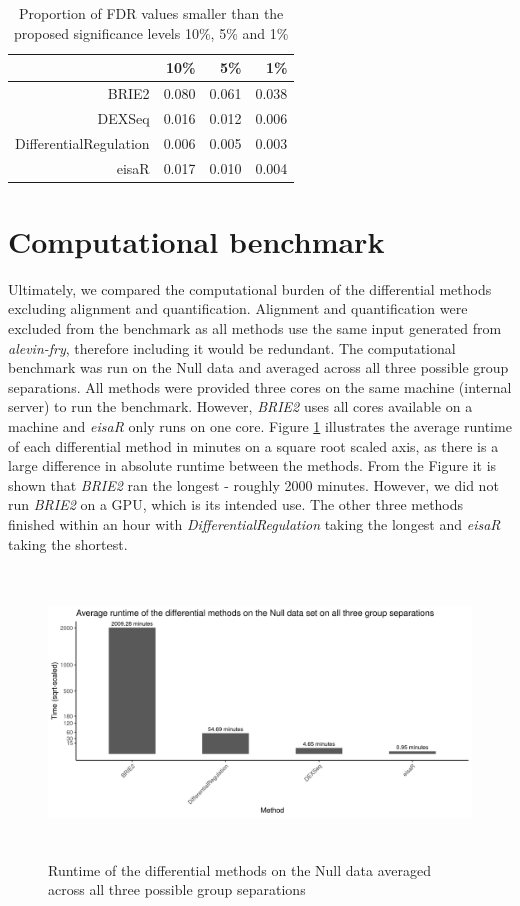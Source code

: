 \begin{table}[!htb]
\centering
\caption{Proportion of FDR values smaller than the proposed significance levels 10\%, 5\% and 1\%}
\begin{tabular}{rrrr}
  \hline
	& 10\% & 5\% & 1\% \\
  \hline
	BRIE2 & 0.080 & 0.061 & 0.038 \\ 
  DEXSeq & 0.016 & 0.012 & 0.006 \\ 
  DifferentialRegulation & 0.006 & 0.005 & 0.003 \\ 
  eisaR & 0.017 & 0.010 & 0.004 \\ 
   \hline
\end{tabular}
\label{tab:fdr}
\end{table}
\FloatBarrier

\section{Computational benchmark}
Ultimately, we compared the computational burden of the differential methods excluding alignment and quantification. Alignment and quantification were excluded from the benchmark as all methods use the same input generated from \emph{alevin-fry}, therefore including it would be redundant. The computational benchmark was run on the Null data and averaged across all three possible group separations. All methods were provided three cores on the same machine (internal server) to run the benchmark. However, \emph{BRIE2} uses all cores available on a machine and \emph{eisaR} only runs on one core. Figure \ref{fig:bench_mark} illustrates the average runtime of each differential method in minutes on a square root scaled axis, as there is a large difference in absolute runtime between the methods. From the Figure it is shown that \emph{BRIE2} ran the longest - roughly 2000 minutes. However, we did not run \emph{BRIE2} on a GPU, which is its intended use. The other three methods finished within an hour with \emph{DifferentialRegulation} taking the longest and \emph{eisaR} taking the shortest.

\begin{figure}[!htb]
\begin{center}
\includegraphics[width=6in,height=3in]{../figures/null_analysis/bench_mark.png}
\end{center}
\caption{Runtime of the differential methods on the Null data averaged across all three possible group separations}
\label{fig:bench_mark}
\end{figure}
\FloatBarrier

